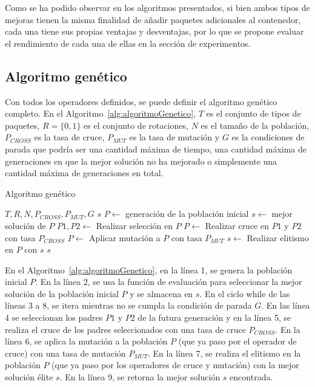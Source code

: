\documentclass[openany]{article}
\begin{document}
Como se ha podido observar en los algoritmos presentados, si bien ambos tipos de mejoras tienen la misma finalidad de añadir paquetes adicionales al contenedor, cada una tiene sus propias ventajas y desventajas, por lo que se propone evaluar el rendimiento de cada una de ellas en la sección de experimentos.


\subsection{Algoritmo genético}

Con todos los operadores definidos, se puede definir el algoritmo genético completo. En el Algoritmo~\ref{alg:algoritmoGenetico}, $T$ es el conjunto de tipos de paquetes, $R = \{0, 1\}$ es el conjunto de rotaciones, $N$ es el tamaño de la población, $P_{CROSS}$ es la tasa de cruce, $P_{MUT}$ es la tasa de mutación y $G$ es la condiciones de parada que podría ser una cantidad máxima de tiempo, una cantidad máxima de generaciones en que la mejor solución no ha mejorado o simplemente una cantidad máxima de generaciones en total.

\begin{algorithm}[H]
    \caption{Algoritmo genético}\label{alg:algoritmoGenetico}
    \begin{algorithmic}[1]
        \Require $T, R, N, P_{CROSS}, P_{MUT}, G$
        \Ensure $s$
        \State $P \leftarrow$ generación de la población inicial
        \State $s \leftarrow$ mejor solución de $P$
        \State $P1,P2 \leftarrow$ Realizar selección en $P$
        \State $P \leftarrow$ Realizar cruce en $P1$ y $P2$ con tasa $P_{CROSS}$
        \State $P \leftarrow$ Aplicar mutación a $P$ con tasa $P_{MUT}$
        \State $s \leftarrow$ Realizar elitismo en $P$ con $s$
        \EndWhile
        \State \Return $s$
    \end{algorithmic}
\end{algorithm}

En el Algoritmo~\ref{alg:algoritmoGenetico}, en la línea 1, se genera la población inicial $P$. En la línea 2, se usa la función de evaluación para seleccionar la mejor solución de la población inicial $P$ y se almacena en $s$. En el ciclo while de las líneas 3 a 8, se itera mientras no se cumpla la condición de parada $G$. En las línea 4 se seleccionan los padres $P1$ y $P2$ de la futura generación y en la línea 5, se realiza el cruce de los padres seleccionados con una tasa de cruce $P_{CROSS}$. En la línea 6, se aplica la mutación a la población $P$ (que ya paso por el operador de cruce) con una tasa de mutación $P_{MUT}$. En la línea 7, se realiza el elitismo en la población $P$ (que ya paso por los operadores de cruce y mutación) con la mejor solución élite $s$. En la línea 9, se retorna la mejor solución $s$ encontrada.
\end{document}
